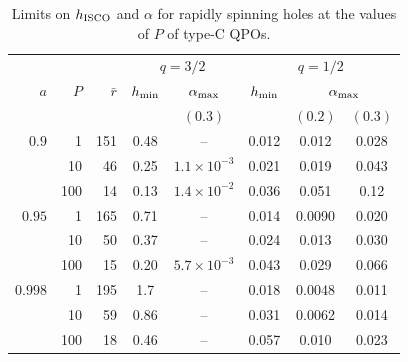\begin{table}
\caption{Limits on $h_\textup{ISCO}$ and $\alpha$ for rapidly spinning holes at the values of $P$ of type-C QPOs.}
\label{tab:xrb}
\centering
\begin{tabular}{rrrccccc}
\hline\hline
 & & & \multicolumn{2}{c}{$q=3/2$} & \multicolumn{3}{c}{$q=1/2$} \\
$a$ & $P$ & $\bar r$ & $h_\textup{min}$ & $\alpha_\textup{max}$ & $h_\textup{min}$ & \multicolumn{2}{c}{$\alpha_\textup{max}$} \\
 & & & & $(0.3)$ & & $(0.2)$ & $(0.3)$ \\
\hline
$0.9$   & 1   & 151 & 0.48 & --                  & 0.012 & 0.012  & 0.028 \\
        & 10  & 46  & 0.25 & $1.1\times10^{-3}$  & 0.021 & 0.019  & 0.043 \\
        & 100 & 14  & 0.13 & $1.4\times10^{-2}$  & 0.036 & 0.051  & 0.12 \\
$0.95$  & 1   & 165 & 0.71 & --                  & 0.014 & 0.0090 & 0.020 \\
        & 10  & 50  & 0.37 & --                  & 0.024 & 0.013  & 0.030 \\
        & 100 & 15  & 0.20 & $5.7\times10^{-3}$  & 0.043 & 0.029  & 0.066 \\
$0.998$ & 1   & 195 & 1.7  & --                  & 0.018 & 0.0048 & 0.011 \\
        & 10  & 59  & 0.86 & --                  & 0.031 & 0.0062 & 0.014 \\
        & 100 & 18  & 0.46 & --                  & 0.057 & 0.010  & 0.023 \\
\hline
\end{tabular}
\end{table}

